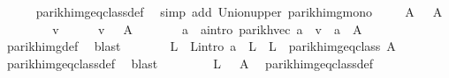 \begin{isabellebody}
\ \ \ \ \isamarkupfalse%
\ parikh{\isacharunderscore}{\kern0pt}img{\isacharunderscore}{\kern0pt}eq{\isacharunderscore}{\kern0pt}class{\isacharunderscore}{\kern0pt}def\ \isamarkupfalse%
\ {\isacharparenleft}{\kern0pt}simp\ add{\isacharcolon}{\kern0pt}\ Union{\isacharunderscore}{\kern0pt}upper\ parikh{\isacharunderscore}{\kern0pt}img{\isacharunderscore}{\kern0pt}mono{\isacharparenright}{\kern0pt}\isanewline
\ \ \isamarkupfalse%
\ {\isachardoublequoteopen}{\isasymPsi}\ {\isacharquery}{\kern0pt}A{\isacharprime}{\kern0pt}\ {\isasymsubseteq}\ {\isasymPsi}\ A{\isachardoublequoteclose}\isanewline
\ \ \isamarkupfalse%
\isanewline
\ \ \ \ \isamarkupfalse%
\ v\isanewline
\ \ \ \ \isamarkupfalse%
\ {\isachardoublequoteopen}v\ {\isasymin}\ {\isasymPsi}\ {\isacharquery}{\kern0pt}A{\isacharprime}{\kern0pt}{\isachardoublequoteclose}\isanewline
\ \ \ \ \isamarkupfalse%
\ \isamarkupfalse%
\ a\ \ a{\isacharunderscore}{\kern0pt}intro{\isacharcolon}{\kern0pt}\ {\isachardoublequoteopen}parikh{\isacharunderscore}{\kern0pt}vec\ a\ {\isacharequal}{\kern0pt}\ v\ {\isasymand}\ a\ {\isasymin}\ {\isacharquery}{\kern0pt}A{\isacharprime}{\kern0pt}{\isachardoublequoteclose}\isanewline
\ \ \ \ \ \ \isamarkupfalse%
\ parikh{\isacharunderscore}{\kern0pt}img{\isacharunderscore}{\kern0pt}def\ \isamarkupfalse%
\ blast\isanewline
\ \ \ \ \isamarkupfalse%
\ \isamarkupfalse%
\ L\ \ L{\isacharunderscore}{\kern0pt}intro{\isacharcolon}{\kern0pt}\ {\isachardoublequoteopen}a\ {\isasymin}\ L\ {\isasymand}\ L\ {\isasymin}\ parikh{\isacharunderscore}{\kern0pt}img{\isacharunderscore}{\kern0pt}eq{\isacharunderscore}{\kern0pt}class\ A{\isachardoublequoteclose}\isanewline
\ \ \ \ \ \ \isamarkupfalse%
\ parikh{\isacharunderscore}{\kern0pt}img{\isacharunderscore}{\kern0pt}eq{\isacharunderscore}{\kern0pt}class{\isacharunderscore}{\kern0pt}def\ \isamarkupfalse%
\ blast\isanewline
\ \ \ \ \isamarkupfalse%
\ \isamarkupfalse%
\ {\isachardoublequoteopen}{\isasymPsi}\ L\ {\isacharequal}{\kern0pt}\ {\isasymPsi}\ A{\isachardoublequoteclose}\ \isamarkupfalse%
\ parikh{\isacharunderscore}{\kern0pt}img{\isacharunderscore}{\kern0pt}eq{\isacharunderscore}{\kern0pt}class{\isacharunderscore}{\kern0pt}def\ \isamarkupfalse%

\end{isabellebody}
